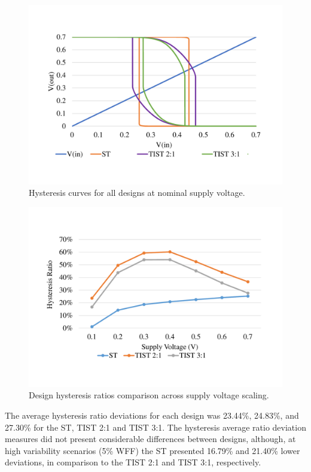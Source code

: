 \documentclass[pgmicro,mestrado,english]{iiufrgs}
\begin{document}
    \begin{figure}[]
        \centering
            \includegraphics[width=1\textwidth, trim={2cm 3cm 2cm 3cm}, clip]{hystGraphs.pdf}
            \caption{Hysteresis curves for all designs at nominal supply voltage.}
        \label{fig:hystCurves}
    \end{figure}
   
    \begin{figure}[]
        \centering
            \includegraphics[width=1\textwidth, trim={2cm 3cm 2cm 3cm}, clip]{hystRatiosVdd.pdf}
            \caption{Design hysteresis ratios comparison across supply voltage scaling.}
        \label{fig:hystRatiosVdd}
    \end{figure}
 
    The average hysteresis ratio deviations for each design was 23.44\%, 24.83\%, and 27.30\% for the ST, TIST 2:1 and TIST 3:1. The hysteresis average ratio deviation measures did not present considerable differences between designs, although, at high variability scenarios (5\% WFF) the ST presented 16.79\% and 21.40\% lower deviations, in comparison to the TIST 2:1 and TIST 3:1, respectively.
    
\end{document}
